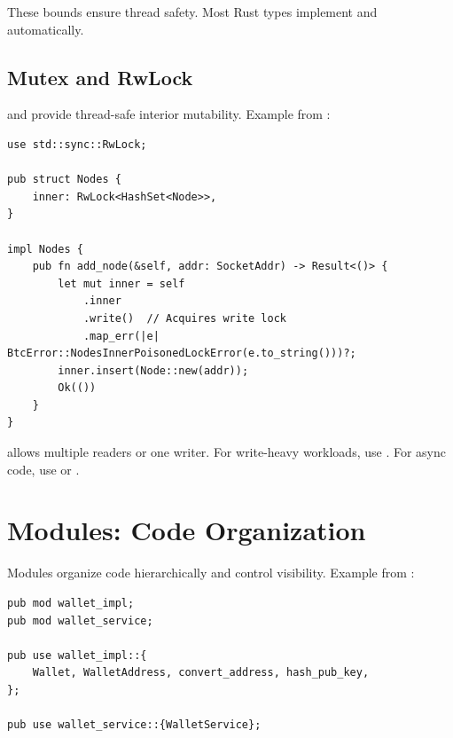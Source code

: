 These bounds ensure thread safety. Most Rust types implement  and  automatically.

\subsection{Mutex and RwLock}
\label{subsec:ch24-locks}

 and  provide thread-safe interior mutability. Example from :

\begin{listing}[htbp]
\caption{RwLock for thread-safe shared state}
\label{lst:ch24-rwlock}
\begin{verbatim}
use std::sync::RwLock;

pub struct Nodes {
    inner: RwLock<HashSet<Node>>,
}

impl Nodes {
    pub fn add_node(&self, addr: SocketAddr) -> Result<()> {
        let mut inner = self
            .inner
            .write()  // Acquires write lock
            .map_err(|e| BtcError::NodesInnerPoisonedLockError(e.to_string()))?;
        inner.insert(Node::new(addr));
        Ok(())
    }
}
\end{verbatim}
\end{listing}

 allows multiple readers or one writer. For write-heavy workloads, use . For async code, use  or .

\section{Modules: Code Organization}
\label{sec:ch24-modules}

Modules organize code hierarchically and control visibility. Example from :

\begin{listing}[htbp]
\caption{Module organization with re-exports}
\label{lst:ch24-modules}
\begin{verbatim}
pub mod wallet_impl;
pub mod wallet_service;

pub use wallet_impl::{
    Wallet, WalletAddress, convert_address, hash_pub_key,
};

pub use wallet_service::{WalletService};
\end{verbatim}
\end{listing}

